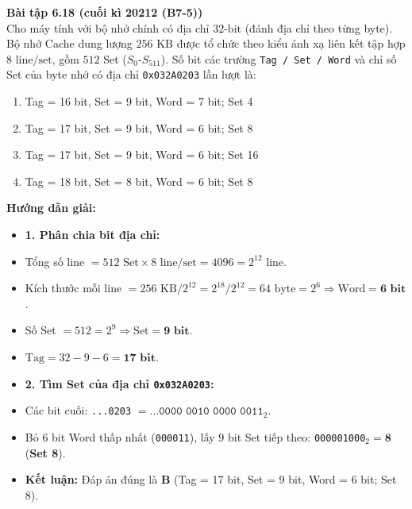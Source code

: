 \textbf{Bài tập 6.18 (cuối kì 20212 (B7-5))}\\
Cho máy tính với bộ nhớ chính có địa chỉ $32\text{-bit}$ (đánh địa chỉ theo từng byte). Bộ nhớ Cache dung lượng $256\text{ KB}$ được tổ chức theo kiểu ánh xạ liên kết tập hợp $8\text{ line/set}$, gồm $512$ Set ($S_0\text{-}S_{511}$). Số bit các trường \texttt{Tag / Set / Word} và chỉ số Set của byte nhớ có địa chỉ \texttt{0x032A0203} lần lượt là:
\begin{enumerate}[label=\Alph*.]
    \item Tag = 16 bit, Set = 9 bit, Word = 7 bit; Set 4
    \item Tag = 17 bit, Set = 9 bit, Word = 6 bit; Set 8
    \item Tag = 17 bit, Set = 9 bit, Word = 6 bit; Set 16
    \item Tag = 18 bit, Set = 8 bit, Word = 6 bit; Set 8
\end{enumerate}
\textbf{Hướng dẫn giải:}
\begin{itemize}
    \item \textbf{1. Phân chia bit địa chỉ:}
    \item Tổng số line $= 512 \text{ Set} \times 8 \text{ line/set} = 4096 = 2^{12}$ line.
    \item Kích thước mỗi line $= 256\text{ KB} / 2^{12} = 2^{18} / 2^{12} = 64\text{ byte} = 2^6 \Rightarrow \text{Word} = \mathbf{6\text{ bit}}$.
    \item Số Set $= 512 = 2^9 \Rightarrow \text{Set} = \mathbf{9\text{ bit}}$.
    \item $\text{Tag} = 32 - 9 - 6 = \mathbf{17\text{ bit}}$.
    \item \textbf{2. Tìm Set của địa chỉ \texttt{0x032A0203}:}
    \item Các bit cuối: \texttt{...0203} $= \dots\texttt{0000 0010 0000 0011}_2$.
    \item Bỏ $6$ bit Word thấp nhất (\texttt{000011}), lấy $9$ bit Set tiếp theo: \texttt{000001000}$_2 = \mathbf{8}$ (\textbf{Set 8}).
    \item \textbf{Kết luận:} Đáp án đúng là \textbf{B} (Tag = 17 bit, Set = 9 bit, Word = 6 bit; Set 8).
\end{itemize}

